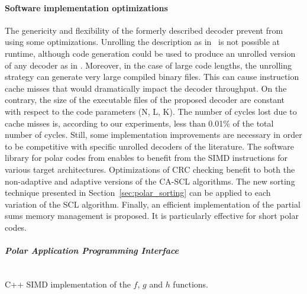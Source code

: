\paragraph{Software implementation optimizations}
\label{sec:polar_implem}

The genericity and flexibility of the formerly described decoder prevent from
using some optimizations. Unrolling the description as in~\cite{Sarkis2016} is
not possible at runtime, although code generation could be used to produce an
unrolled version of any decoder as in \cite{Cassagne2015c}. Moreover, in the
case of large code lengths, the unrolling strategy can generate very large
compiled binary files. This can cause instruction cache misses that would
dramatically impact the decoder throughput. On the contrary, the size of the
executable files of the proposed decoder are constant with respect to the code
parameters (N, L, K). The number of cycles lost due to cache misses is,
according to our experiments, less than 0.01\% of the total number of cycles.
Still, some implementation improvements are necessary in order to be competitive
with specific unrolled decoders of the literature. The software library for
polar codes from \cite{Cassagne2015c,Cassagne2016b} enables to benefit from
the SIMD instructions for various target architectures. Optimizations of CRC
checking benefit to both the non-adaptive and adaptive versions of the CA-SCL
algorithms. The new sorting technique presented in
Section~\ref{sec:polar_sorting} can be applied to each variation of the SCL
algorithm. Finally, an efficient implementation of the partial sums memory
management is proposed. It is particularly effective for short polar codes.

\subparagraph{Polar Application Programming Interface}

\begin{listing}
  \inputminted[frame=lines,linenos]{C++}{main/chapter2/src/polar/f_g_h_simd.cpp}
  \caption{C++ SIMD implementation of the $f$, $g$ and $h$ functions.}
  \label{lst:polar_f_g_h_simd}
\end{listing}

